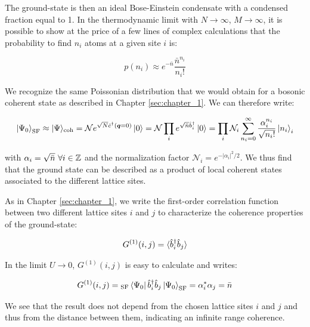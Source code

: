\noindent The ground-state is then an ideal Bose-Einstein condensate with a condensed fraction equal to 1. In the thermodynamic limit with $N \to \infty$, $M \to \infty$, it is possible to show at the price of a few lines of complex calculations \cite{gerbier_notes} that the probability to find $n_i$ atoms at a given site $i$ is:

\begin{equation}
    p\left(n_{i}\right) \approx e^{-\bar{n}} \frac{\bar{n}^{n_{i}}}{n_{i} !}
\end{equation}

\noindent We recognize the same Poissonian distribution that we would obtain for a bosonic coherent state as described in Chapter \ref{sec:chapter_1}. We can therefore write:

\begin{equation}
    \ket{\Psi_0}_{\mathrm{SF}} \approx |\Psi\rangle_{\mathrm{coh}}=\mathcal{N} e^{\sqrt{N} \hat{c}^{\dagger}(\bm{q}=0)} \ket{0} = \mathcal{N} \prod_{i} e^{\sqrt{\bar{n}} \hat{b}_{i}^{\dagger}} \ket{0} = \prod_{i} \mathcal{N}_{i} \sum_{n_{i}=0}^{\infty} \frac{\alpha_{i}^{n_{i}}}{\sqrt{n_{i} !}}\left|n_{i}\right\rangle_{i}
    \label{eq:ground-state_superfluid}
\end{equation}

\noindent with $\alpha_i=\sqrt{\bar{n}} \ \forall i \in \mathbb{Z}$ and the normalization factor $\mathcal{N}_{i}=e^{-\left|\alpha_{i}\right|^{2} / 2}$. We thus find that the ground state can be described as a product of local coherent states associated to the different lattice sites.

As in Chapter \ref{sec:chapter_1}, we write the first-order correlation function between two different lattice sites $i$ and $j$ to characterize the coherence properties of the ground-state:

\begin{equation}
    G^{(1)}(i,j)= \langle\hat{b}^{\dagger}_i \hat{b}_j\rangle
\end{equation}

\noindent In the limit $U \to 0$, $G^{(1)}(i,j)$ is easy to calculate and writes:

\begin{equation}
    G^{(1)}(i,j)= {}_{\mathrm{SF}} \bra{\Psi_0} \hat{b}^{\dagger}_i \hat{b}_j \ket{\Psi_0}_{\mathrm{SF}} = \alpha^*_i \alpha_j = \bar{n}
\end{equation}

\noindent We see that the result does not depend from the chosen lattice sites $i$ and $j$ and thus from the distance between them, indicating an infinite range coherence.


